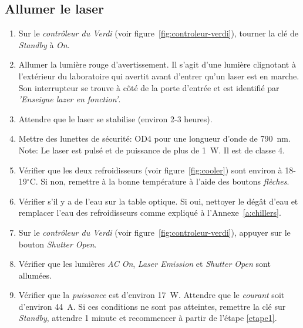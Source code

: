 \subsection{Allumer le laser}
\label{ssec:allumer_le_laser}
\begin{enumerate}
    \item \label{etape1} Sur le \textit{contrôleur du Verdi} (voir figure~\ref{fig:controleur-verdi}), tourner la clé de \textit{Standby} à \textit{On}.
    \item Allumer la lumière rouge d'avertissement. Il s'agit d'une lumière clignotant à l'extérieur du laboratoire qui avertit avant d'entrer qu'un laser est en marche. Son interrupteur se trouve à côté de la porte d'entrée et est identifié par \textit{'Enseigne lazer en fonction'}.
    \item Attendre que le laser se stabilise (environ 2-3 heures).
    \item Mettre des lunettes de sécurité: OD4 pour une longueur d'onde de 790~nm. 
    \\ Note: Le laser est pulsé et de puissance de plus de 1~W. Il est de classe 4.
    \item Vérifier que les deux refroidisseurs (voir figure~\ref{fig:cooler}) sont environ à 18-19$^\circ$C.
    Si non, remettre à la bonne température à l'aide des boutons \textit{flèches}.
    \item Vérifier s'il y a de l'eau sur la table optique. Si oui, nettoyer le dégât d'eau et remplacer l'eau des refroidisseurs comme expliqué à l'Annexe~\ref{a:chillers}.
    \item Sur le \textit{contrôleur du Verdi} (voir figure~\ref{fig:controleur-verdi}), appuyer sur le bouton \textit{Shutter Open}.
    \item Vérifier que les lumières \textit{AC On}, \textit{Laser Emission} et \textit{Shutter Open} sont allumées.
    \item Vérifier que la \textit{puissance} est d'environ 17~W. Attendre que le \textit{courant} soit d'environ 44~A. Si ces conditions ne sont pas atteintes, remettre la clé sur \textit{Standby}, attendre 1 minute et recommencer à partir de l'étape \ref{etape1}.
\end{enumerate}